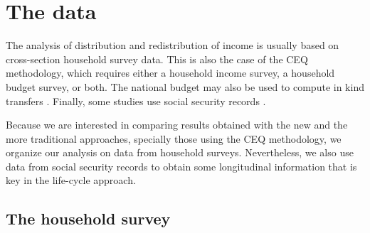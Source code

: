 \documentclass{article}
\begin{document}
\begin{comment}
    

\section{Objectives} \label{sec:objectives}

\textbf{General objective}
\begin{itemize}
\item Implementation of a novel approach for the measurement of pensions income and the redistributive impact of pensions.
\end{itemize}  

\textbf{Specific objectives}
\begin{itemize}
    \item Proposal of a step-by-step application for implementing the alternative approach.
    \item Quantification of the effect of the alternative measurement in the distribution of income.
    \item Measurement of the effect of the alternative approach in the redistributive effect of social security.
\end{itemize}
\end{comment}

\section{The data} \label{sec:data}

The analysis of distribution and redistribution of income is usually based on cross-section household survey data. This is also the case of the CEQ methodology, which requires either a household income survey, a household budget survey, or both. The national budget may also be used to compute in kind transfers \parencite{Lustig2022a, Lustig2022b}. Finally, some studies use social security records \parencite[see, among others][]{Forteza2012, Forteza2014, Moncarz2015, Fajnzylber2012, Zylberstajn2011}.

Because we are interested in comparing results obtained with the new and the more traditional approaches, specially those using the CEQ methodology, we organize our analysis on data from household surveys. Nevertheless, we also use data from social security records to obtain some longitudinal information that is key in the life-cycle approach.  

\subsection{The household survey}
\end{document}
